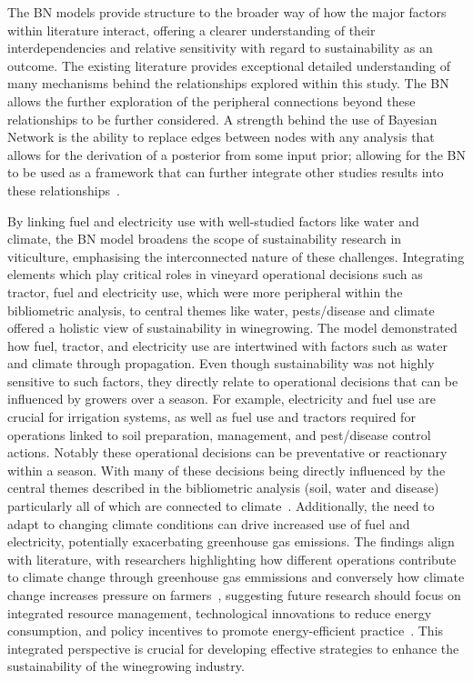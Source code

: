 The BN models provide structure to the broader way of how the major factors within literature interact, offering a clearer understanding of their interdependencies and relative sensitivity with regard to sustainability as an outcome. The existing literature provides exceptional detailed understanding of many mechanisms behind the relationships explored within this study. The BN allows the further exploration of the peripheral connections beyond these relationships to be further considered. A strength behind the use of Bayesian Network is the ability to replace edges between nodes with any analysis that allows for the derivation of a posterior from some input prior; allowing for the BN to be used as a framework that can further integrate other studies results into these relationships~\cite{kimphuctranMachineLearningProbabilistic2022,kollerObjectOrientedBayesianNetworks1997,korbBayesianArtificialIntelligence2011}.

By linking fuel and electricity use with well-studied factors like water and climate, the BN model broadens the scope of sustainability research in viticulture, emphasising the interconnected nature of these challenges. Integrating elements which play critical roles in vineyard operational decisions such as tractor, fuel and electricity use, which were more peripheral within the bibliometric analysis, to central themes like water, pests/disease and climate offered a holistic view of sustainability in winegrowing. The model demonstrated how fuel, tractor, and electricity use are intertwined with factors such as water and climate through propagation. Even though sustainability was not highly sensitive to such factors, they directly relate to operational decisions that can be influenced by growers over a season. For example, electricity and fuel use are crucial for irrigation systems, as well as fuel use and tractors required for operations linked to soil preparation, management, and pest/disease control actions. Notably these operational decisions can be preventative or reactionary within a season. With many of these decisions being directly influenced by the central themes described in the bibliometric analysis (soil, water and disease) particularly all of which are connected to climate~\cite{fragaClimateChangeNew2020,tofaloClimateChangeWine2023,naigeonDATADecisionmakingViticulture2023}. Additionally, the need to adapt to changing climate conditions can drive increased use of fuel and electricity, potentially exacerbating greenhouse gas emissions. The findings align with literature, with researchers highlighting how different operations contribute to climate change through greenhouse gas emmissions \cite{pilafidisAssessingEnergyUse2023,cechPesticideUseAssociated2022,zhangEstimatingEconomicEnvironmental2019} and conversely how climate change increases pressure on farmers~\cite{barnaEditorialImprovingSustainability2023,costaRoleSoilTemperature2023,atakClimateChangeAdaptive2024}, suggesting future research should focus on integrated resource management, technological innovations to reduce energy consumption, and policy incentives to promote energy-efficient practice~\cite{pereiraViticultureClimateChange2023}. This integrated perspective is crucial for developing effective strategies to enhance the sustainability of the winegrowing industry.

